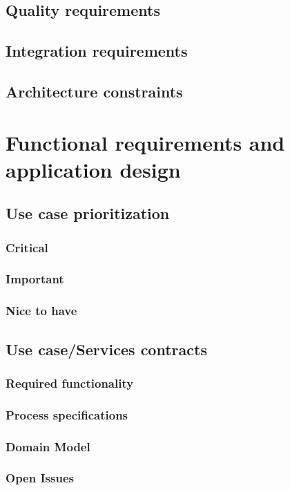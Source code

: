 \documentclass[a4paper, 10pt, oneside]{report}
\begin{document}
	\section{Quality requirements}
	\section{Integration requirements}
	\section{Architecture constraints}

\chapter{ Functional requirements and application design}
	\section{Use case prioritization}
		\subsection{Critical}
		\subsection{Important}
		\subsection{Nice to have}
	\section{Use case/Services contracts}

\newpage

\newpage

\newpage

\newpage

\newpage

\newpage

\newpage

\subsection{Required functionality}
\subsection{Process specifications}
\subsection{Domain Model}
\subsection{Open Issues}
\end{document}
